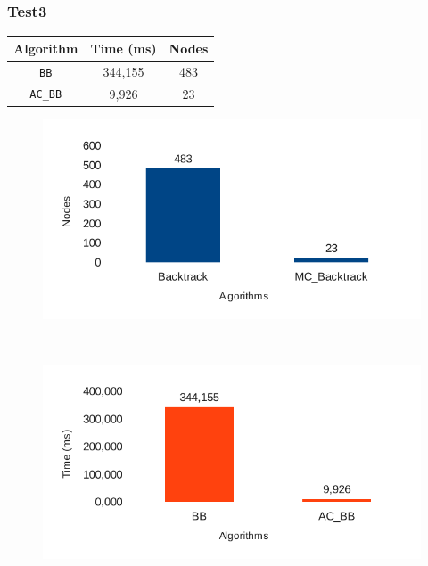 \documentclass{beamer}
\begin{document}
\begin{frame}
\frametitle{Test3}

\begin{longtable}{c c c}
\toprule
\textbf{Algorithm} & \textbf{Time (ms)} & \textbf{Nodes}\\
\midrule
\texttt{BB} & 344,155 & 483 \\
\midrule
\texttt{AC\_BB} & 9,926 & 23 \\
\bottomrule
\end{longtable}

\vspace{.5cm}

\begin{minipage}[c]{.4\linewidth}
\begin{figure}[!h]
\begin{center}
\includegraphics[scale=0.55]{./report-images/test3_nodes.pdf}
\end{center}
\end{figure}
\end{minipage}\hspace{1cm}~
\begin{minipage}[c]{.4\linewidth}
\begin{figure}[!h]
\begin{center}
\includegraphics[scale=0.55]{./report-images/test3_time.pdf}
\end{center}
\end{figure}
\end{minipage}

\end{frame}


\end{document}
